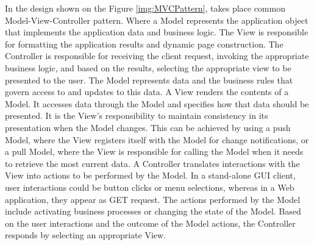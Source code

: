     In the design shown on the Figure \ref{img:MVCPattern}, takes place common Model-View-Controller pattern. Where a Model represents the application object that implements the application data and business logic. The View is responsible for formatting the application results and dynamic page construction. The Controller is responsible for receiving the client request, invoking the appropriate business logic, and based on the results, selecting the appropriate view to be presented to the user. The Model represents data and the business rules that govern access to and updates to this data. A View renders the contents of a Model. It accesses data through the Model and specifies how that data should be presented. It is the View's responsibility to maintain consistency in its presentation when the Model changes. This can be achieved by using a push Model, where the View registers itself with the Model for change notifications, or a pull Model, where the View is responsible for calling the Model when it needs to retrieve the most current data. A Controller translates interactions with the View into actions to be performed by the Model. In a stand-alone GUI client, user interactions could be button clicks or menu selections, whereas in a Web application, they appear as GET request. The actions performed by the Model include activating business processes or changing the state of the Model. Based on the user interactions and the outcome of the Model actions, the Controller responds by selecting an appropriate View.


